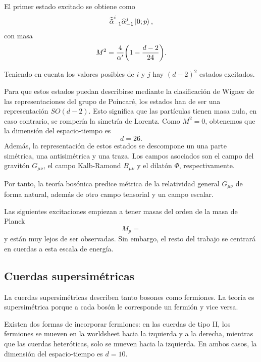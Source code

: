 El primer estado excitado se obtiene como
\begin{equation}
  \widehat{\tilde\alpha}_{-1}^i\widehat \alpha_{-1}^j\ket{0;p},
\end{equation}
con masa
\begin{equation}
  M^2 = \frac{4}{\alpha'}\qty(1-\frac{d-2}{24}).
\end{equation}

Teniendo en cuenta los valores posibles de $i$ y $j$ hay $(d-2)^2$ estados excitados.


Para que estos estados puedan describirse mediante la clasificación de Wigner de las
representaciones del grupo de Poincaré, los estados han de ser una representación $SO(d-2)$.
Esto significa que las partículas tienen masa nula, en caso contrario, se rompería la simetría
de Lorentz. Como $M^2=0$, obtenemos que la dimensión del espacio-tiempo es
\begin{equation}
  d=26.
\end{equation}
Además, la representación de estos estados se descompone un una parte simétrica, una antisimétrica
y una traza. Los campos asociados son el campo del gravitón $G_{\mu\nu}$, el campo Kalb-Ramond $B_{\mu\nu}$
y el dilatón $\Phi$, respectivamente.

Por tanto, la teoría bosónica predice métrica de la relatividad general $G_{\mu\nu}$ de forma 
natural, además de otro campo tensorial y un campo escalar.

Las siguientes excitaciones empiezan a tener masas del orden de la masa de Planck
\begin{equation}
  M_p=
\end{equation}
y están muy lejos de ser observadas. Sin embargo, el resto del trabajo se centrará en cuerdas
a esta escala de energía.


\subsection{Cuerdas supersimétricas}

La cuerdas supersimétricas describen tanto bosones como fermiones.
La teoría es supersimétrica porque a cada bosón le corresponde un fermión y vice versa.

Existen dos formas de incorporar fermiones:
en las cuerdas de tipo II, los fermiones se mueven en la worldsheet hacia la izquierda y a la derecha,
mientras que las cuerdas heteróticas, solo se mueven hacia la izquierda.
En ambos casos, la dimensión del espacio-tiempo es $d=10$.

